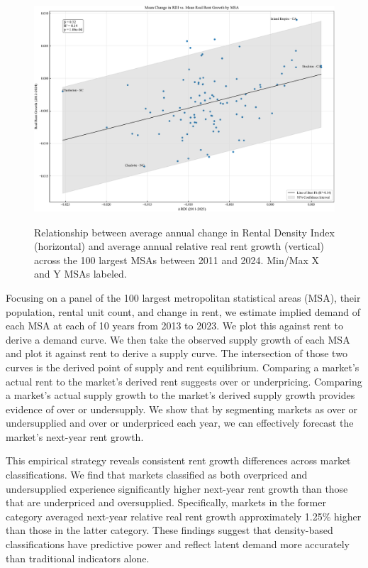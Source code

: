\documentclass[APA,Times1COL]{WileyNJDv5} %
\begin{document}
\begin{figure}[htb!]
	\centerline{\includegraphics[height=20pc]{rdi_rent_growth_2024.pdf}}
	\caption{Relationship between average annual change in Rental Density Index (horizontal) and average annual relative real rent growth (vertical) across the 100 largest MSAs between 2011 and 2024. Min/Max X and Y MSAs labeled.\label{fig:rdi_national}}
\end{figure}

Focusing on a panel of the 100 largest metropolitan statistical areas (MSA), their population, rental unit count, and change in rent, we estimate implied demand of each MSA at each of 10 years from 2013 to 2023. We plot this against rent to derive a demand curve. We then take the observed supply growth of each MSA and plot it against rent to derive a supply curve. The intersection of those two curves is the derived point of supply and rent equilibrium. Comparing a market's actual rent to the market's derived rent suggests over or underpricing. Comparing a market's actual supply growth to the market's derived supply growth provides evidence of over or undersupply. We show that by segmenting markets as over or undersupplied and over or underpriced each year, we can effectively forecast the market's next-year rent growth.  

This empirical strategy reveals consistent rent growth differences across market classifications. We find that markets classified as both overpriced and undersupplied experience significantly higher next-year rent growth than those that are underpriced and oversupplied. Specifically, markets in the former category averaged next-year relative real rent growth approximately 1.25\% higher than those in the latter category. These findings suggest that density-based classifications have predictive power and reflect latent demand more accurately than traditional indicators alone.
\end{document}
